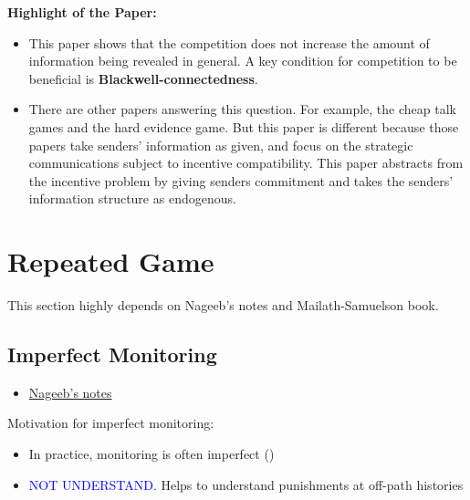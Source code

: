 \documentclass{book}
\theoremstyle{plain}
\theoremstyle{definition}
\begin{document}
\textbf{}

\vspace{1em}
\noindent
\textbf{Highlight of the Paper:}
\begin{itemize}
	\item This paper shows that the competition does not increase the amount of information being revealed in general. A key condition for competition to be beneficial is \textbf{Blackwell-connectedness}.

	\item There are other papers answering this question. For example, the cheap talk games and the hard evidence game. But this paper is different because those papers take senders' information as given, and focus on the strategic communications subject to incentive compatibility.
	This paper abstracts from the incentive problem by giving senders commitment and takes the senders' information structure as endogenous.

\end{itemize}







\section{Repeated Game} %
\label{sec:repeated_game}


This section highly depends on Nageeb's notes and Mailath-Samuelson book.

\subsection{Imperfect Monitoring} %
\label{sub:imperfect_monitoring}

\begin{itemize}
	\item \href{run:resources/repeated_game/imperfect_monitoring_najeeb.pdf}{Nageeb's notes}
\end{itemize}

Motivation for imperfect monitoring:
\begin{itemize}
	\item In practice, monitoring is often imperfect (\cite{Green_Porter:1984EMCA})
	\item \textcolor{blue}{NOT UNDERSTAND.} Helps to understand punishments at off-path histories
\end{itemize}
\end{document}
